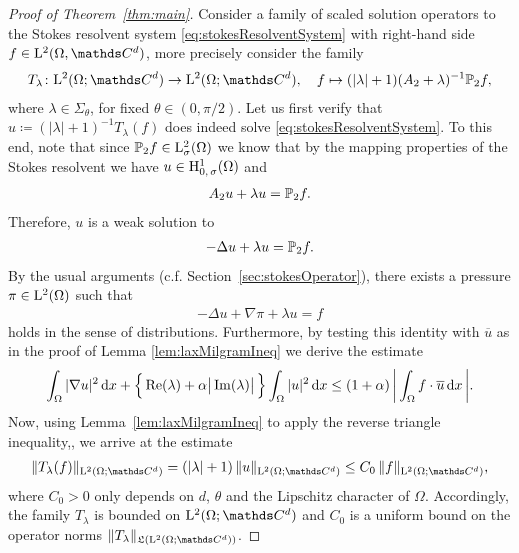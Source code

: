 \begin{proof}[Proof of Theorem~\ref{thm:main}]
  Consider a family of scaled solution operators to the Stokes resolvent system \eqref{eq:stokesResolventSystem} with right-hand side $f \in \Ell^2(\Omega, \C^d)$, more precisely consider the family
  \begin{align*}
    T_\lambda \colon \Ell^2(\Omega; \C^d) \to \Ell^2(\Omega; \C^d), \quad f \mapsto (|\lambda| + 1) (A_2 + \lambda)^{-1} \PP_2 f,
  \end{align*}
  where $\lambda \in \Sigma_\theta$, for fixed $\theta \in (0, \pi/2)$.
  Let us first verify that $u \coloneqq (|\lambda| + 1)^{-1} T_\lambda(f)$ does indeed solve \eqref{eq:stokesResolventSystem}.
  To this end, note that since $\mathbb{P}_2 f \in \mathrm{L}^2_\sigma(\Omega)$ we know that by the mapping properties of the Stokes resolvent we have $u \in \mathrm{H}^1_{0,\,\sigma}(\Omega)$ and
  \begin{align*}
    A_2 u + \lambda u = \mathbb{P}_2 f.
  \end{align*}
  Therefore, $u$ is a weak solution to 
  \begin{align*}
    -\Delta u + \lambda u = \mathbb{P}_2 f.
  \end{align*}
  By the usual arguments (c.f. Section~\ref{sec:stokesOperator}), there exists a pressure $\pi \in \mathrm{L}^2(\Omega)$ such that 
  \begin{align*}
    -\Delta u + \nabla \pi + \lambda u = f
  \end{align*}
  holds in the sense of distributions.
  Furthermore, by testing this identity with $\overline u$ as in the proof of Lemma \ref{lem:laxMilgramIneq} we derive the estimate
  \begin{align}
    \label{eq:inequalityUnderConsideration}
    \int_\Omega |\nabla u|^2 \, {\operatorname{d}\!{x}} + \Big\{ \operatorname{Re}(\lambda) + \alpha \big| \operatorname{Im}(\lambda) \big| \, \Big\} \int_\Omega |u|^2 \, {\operatorname{d}\!{x}} 
    \leq (1 + \alpha)\, \bigg| \int_\Omega f \cdot \overline u \, {\operatorname{d}\!{x}}\, \bigg|.
  \end{align} 
  Now, using Lemma~\ref{lem:laxMilgramIneq} to apply the reverse triangle inequality,, we arrive at the estimate
  \begin{align*}
    \| T_\lambda(f) \|_{\Ell^2(\Omega; \C^d)} = (|\lambda| + 1)\, \|u\|_{\Ell^2(\Omega; \C^d)}
    \leq C_0 \, \|f\|_{\Ell^2(\Omega; \C^d)},
  \end{align*}
  where $C_0 > 0$ only depends on $d$, $\theta$ and the Lipschitz character of $\Omega$.
  Accordingly, the family $T_\lambda$ is bounded on $\Ell^2(\Omega; \C^d)$ and $C_0$ is a uniform bound on the operator norms $\|T_\lambda\|_{\Li(\Ell^2(\Omega; \C^d))}$.


\end{proof}
